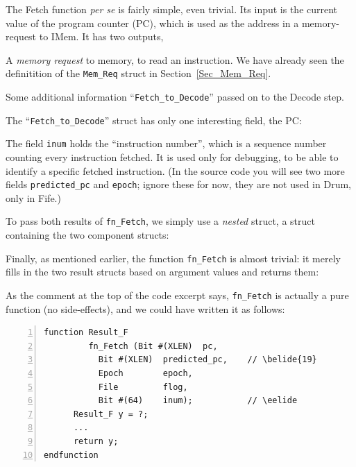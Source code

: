 \label{Sec_Fetch_function}


The Fetch function \emph{per se} is fairly simple, even trivial.  Its
input is the current value of the program counter (PC), which is used
as the address in a memory-request to IMem.  It has two outputs,

\begin{tightlist}

 \item A \emph{memory request} to memory, to read an instruction.  We
       have already seen the definitition of the \verb|Mem_Req| struct
       in Section~\ref{Sec_Mem_Req}.

 \item Some additional information ``\verb|Fetch_to_Decode|'' passed
       on to the Decode step.

\end{tightlist}

The ``\verb|Fetch_to_Decode|'' struct has only one interesting field,
the PC:



The field \verb|inum| holds the ``instruction number'', which is a
sequence number counting every instruction fetched.  It is used only
for debugging, to be able to identify a specific fetched instruction.
(In the source code you will see two more fields \verb|predicted_pc|
and \verb|epoch|; ignore these for now, they are not used in Drum,
only in Fife.)


To pass both results of \verb|fn_Fetch|, we simply use a \emph{nested}
struct, {\ie} a struct containing the two component structs:



Finally, as mentioned earlier, the function \verb|fn_Fetch| is almost
trivial: it merely fills in the two result structs based on argument
values and returns them:



As the comment at the top of the code excerpt says, \verb|fn_Fetch| is
actually a pure function (no side-effects), and we could have written
it as follows:

{\small
\begin{Verbatim}[frame=single, numbers=left]
function Result_F
         fn_Fetch (Bit #(XLEN)  pc,
		   Bit #(XLEN)  predicted_pc,    // \belide{19}
		   Epoch        epoch,
		   File         flog,
		   Bit #(64)    inum);           // \eelide
      Result_F y = ?;
      ...
      return y;
endfunction
\end{Verbatim}
}

